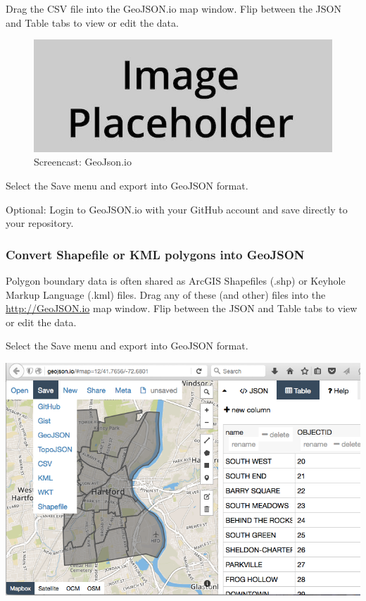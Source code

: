 \documentclass[
  english,
]{book}
\begin{document}
Drag the CSV file into the GeoJSON.io map window. Flip between the JSON and Table tabs to view or edit the data.

\begin{figure}
\centering
\includegraphics{images/placeholder.jpg}
\caption{\label{fig:geojsonio}Screencast: GeoJson.io}
\end{figure}

Select the Save menu and export into GeoJSON format.

Optional: Login to GeoJSON.io with your GitHub account and save directly to your repository.

\hypertarget{convert-shapefile-or-kml-polygons-into-geojson}{%
\subsubsection*{Convert Shapefile or KML polygons into GeoJSON}\label{convert-shapefile-or-kml-polygons-into-geojson}}

Polygon boundary data is often shared as ArcGIS Shapefiles (.shp) or Keyhole Markup Language (.kml) files. Drag any of these (and other) files into the \url{http://GeoJSON.io} map window. Flip between the JSON and Table tabs to view or edit the data.

Select the Save menu and export into GeoJSON format.

\includegraphics{images/09-transform/geojson-save-as.png}
\end{document}

